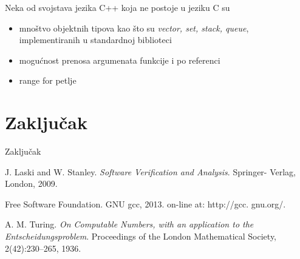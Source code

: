 \documentclass[a4paper]{article}
\begin{document}
Neka od svojstava jezika C++ koja ne postoje u jeziku C su
\begin{itemize}
    \item mnoštvo objektnih tipova kao što su {\em vector, set, stack, queue}, implementiranih u standardnoj biblioteci
    \item mogućnost prenosa argumenata funkcije i po referenci
    \item range for petlje
\end{itemize}

\noindent\makebox[\textwidth]{
\begingroup
\renewcommand*{\arraystretch}{1.2}
\begin{tabular}{|c||c|c|}
\hline
Osobina & C & C++ \\
\hline
Programska paradigma & Imperativna & Objektno-orijentisana \\
\hline
Osnova & Asembler & C programski jezik \\
\hline
Petprocesorske direktive & ? & ?\\
\hline
Pristup u programiranju & S vrha - nanže & S dna - naviše\\
\hline
Alokacija memorije & Korišćenjem bibliotečkih funkcija & Korišćenjem ključnih reči \\
\hline
Prenos argumenata funkcije & Po vrednosti & Po vrednosti, moguće i po referenci\\
\hline
Pokazivači & podržani & podržani\\
\hline
Upravljanje izuzecima & nije podržano & podržano \\
\hline
\end{tabular}
\endgroup
}

\section{Zaključak}
\label{sec:zakljucak}
Zaključak


\appendix

\iffalse


\fi

\begin{thebibliography}{9}

 J. Laski and W. Stanley. \emph{Software Verification and Analysis}. Springer- Verlag, London, 2009.

 Free Software Foundation. GNU gcc, 2013. on-line at: http://gcc. gnu.org/.

 A. M. Turing. \emph{On Computable Numbers, with an application to the Entscheidungsproblem}. Proceedings of the London Mathematical Society, 2(42):230–265, 1936.


\end{thebibliography}
\end{document}
